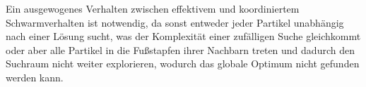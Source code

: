 Ein ausgewogenes Verhalten zwischen effektivem und koordiniertem
Schwarmverhalten ist notwendig, da sonst entweder jeder Partikel unabhängig
nach einer Lösung sucht, was der Komplexität einer zufälligen Suche gleichkommt
oder aber alle Partikel in die Fußstapfen ihrer Nachbarn treten und dadurch
den Suchraum nicht weiter explorieren, wodurch das globale Optimum nicht
gefunden werden kann.
